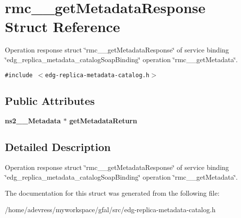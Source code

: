 \section{rmc\_\-\_\-get\-Metadata\-Response Struct Reference}
\label{structrmc____getMetadataResponse}
Operation response struct \char`\"{}rmc\_\-\_\-get\-Metadata\-Response\char`\"{} of service binding \char`\"{}edg\_\-replica\_\-metadata\_\-catalog\-Soap\-Binding\char`\"{} operation \char`\"{}rmc\_\-\_\-get\-Metadata\char`\"{}.  


{\tt \#include $<$edg-replica-metadata-catalog.h$>$}

\subsection*{Public Attributes}
\begin{CompactItemize}
\item 
\bf{ns2\_\-\_\-Metadata} $\ast$ \textbf{get\-Metadata\-Return}\label{structrmc____getMetadataResponse_c18eb8ddf1b49cd7ba8fb9b0a92cb781}

\end{CompactItemize}


\subsection{Detailed Description}
Operation response struct \char`\"{}rmc\_\-\_\-get\-Metadata\-Response\char`\"{} of service binding \char`\"{}edg\_\-replica\_\-metadata\_\-catalog\-Soap\-Binding\char`\"{} operation \char`\"{}rmc\_\-\_\-get\-Metadata\char`\"{}. 



The documentation for this struct was generated from the following file:\begin{CompactItemize}
\item 
/home/adevress/myworkspace/gfal/src/edg-replica-metadata-catalog.h\end{CompactItemize}

